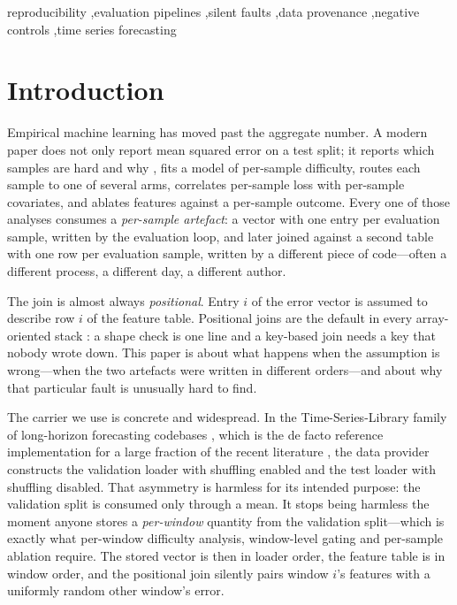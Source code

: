 \documentclass[a4paper,fleqn]{cas-sc}
\begin{document}
\begin{keywords}
reproducibility \sep evaluation pipelines \sep silent faults \sep data provenance
\sep negative controls \sep time series forecasting
\end{keywords}

\maketitle

\section{Introduction}
\label{sec:intro}

Empirical machine learning has moved past the aggregate number. A modern paper
does not only report mean squared error on a test split; it reports which samples
are hard and why \citep{hyndman2006}, fits a model of per-sample difficulty,
routes each sample to one of several arms, correlates per-sample loss with
per-sample covariates, and ablates features against a per-sample outcome. Every
one of those analyses consumes a \emph{per-sample artefact}: a vector with one
entry per evaluation sample, written by the evaluation loop, and later joined
against a second table with one row per evaluation sample, written by a different
piece of code---often a different process, a different day, a different author.

The join is almost always \emph{positional}. Entry $i$ of the error vector is
assumed to describe row $i$ of the feature table. Positional joins are the default
in every array-oriented stack \citep{harris2020numpy,mckinney2010}: a shape check
is one line and a key-based join needs a key that nobody wrote down. This paper is
about what happens when the assumption is wrong---when the two artefacts were
written in different orders---and about why that particular fault is unusually hard
to find.

The carrier we use is concrete and widespread. In the Time-Series-Library
family of long-horizon forecasting codebases \citep{tslib,wu2023timesnet}, which
is the de facto reference implementation for a large fraction of the recent
literature \citep{zhou2021informer,wu2021autoformer,zeng2023dlinear,nie2023patchtst,liu2024itransformer},
the data provider constructs the validation loader with shuffling enabled and the
test loader with shuffling disabled. That asymmetry is harmless for its intended
purpose: the validation split is consumed only through a mean. It stops being
harmless the moment anyone stores a \emph{per-window} quantity from the validation
split---which is exactly what per-window difficulty analysis, window-level gating
and per-sample ablation require. The stored vector is then in loader order, the
feature table is in window order, and the positional join silently pairs window
$i$'s features with a uniformly random other window's error.
\end{document}
